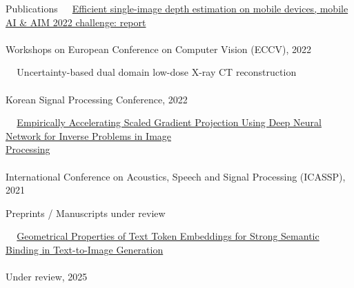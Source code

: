 \documentclass{resume} %
\newcommand{\mycolor}[1]{\textcolor{myurlcolor}{#1}}
\begin{document}
\begin{rSection}{Publications}
\textbullet~\,\, \href{https://link.springer.com/chapter/10.1007/978-3-031-25066-8_4}{Efficient single-image depth estimation on mobile devices, mobile AI \& AIM 2022 challenge: report}
\\ 
\\ \hspace*{1.5em}Workshops on European Conference on Computer Vision (ECCV), 2022





\textbullet~\,\, {\mycolor{Uncertainty-based dual domain low-dose X-ray CT reconstruction}}
\\ 
\\ \hspace*{1.5em}Korean Signal Processing Conference, 2022

\textbullet~\,\, \href{https://ieeexplore.ieee.org/document/9415023}{Empirically Accelerating Scaled Gradient Projection Using Deep Neural Network for Inverse Problems in Image \\ \hspace*{1.5em}Processing}
\\ 
\\ \hspace*{1.5em}International Conference on Acoustics, Speech and Signal Processing (ICASSP), 2021 \\
\end{rSection} 



\begin{rSection}{Preprints / Manuscripts under review}


\textbullet~\,\, \href{https://arxiv.org/pdf/2503.23011}{Geometrical Properties of Text Token Embeddings for Strong Semantic Binding in Text-to-Image Generation}
\\ 
\\ \hspace*{1.5em}Under review, 2025

\end{rSection}
\end{document}
